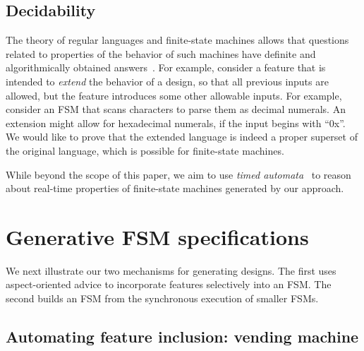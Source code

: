 \documentclass[sigplan,anonymous,review]{acmart}
\begin{document}
\subsection{Decidability}\label{sec:decide}

The theory of regular languages and finite-state machines allows that questions related to properties of the behavior of such machines have definite and algorithmically obtained answers~\cite{sipser}. For example, consider a feature that is intended to \emph{extend} the behavior of a design, so that all previous inputs are allowed, but the feature introduces some other allowable inputs. For example, consider an FSM that scans characters to parse them as decimal numerals.  An extension might allow for hexadecimal numerals, if the input begins with ``0x''.  We would like to prove that the extended language is indeed a proper superset of the original language, which is possible for finite-state machines.

While beyond the scope of this paper, we aim to use \emph{timed automata}~\cite{10.1145/2518102} to reason about real-time properties of finite-state machines generated by our approach.

\section{Generative FSM specifications}

We next illustrate our two mechanisms for generating designs.  The first uses aspect-oriented advice to incorporate features selectively into an FSM.  The second builds an FSM from the synchronous execution of smaller FSMs.

\subsection{Automating feature inclusion: vending machine}\label{sec:vend}
\end{document}
